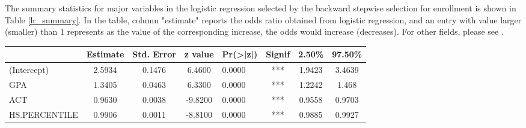 \documentclass[12pt,english]{report}
\begin{document}
The summary statistics for major variables in the logistic regression selected by the backward stepwise selection for enrollment is shown in Table \ref{lr_summary}. In the table, column "estimate" reports the odds ratio obtained from logistic regression, and an entry with value larger (smaller) than 1 represents as the value of the corresponding increase, the odds would  increase (decreases). For other fields, please see \citep{DesJardins2006, long2006regression}. 

\begin{table}[H]
\centering
\begin{adjustbox}{width=0.95\textwidth}
\begin{tabular}{|lccclccc|} \hline \hline
                               & Estimate & Std. Error & z value  &
                                                           Pr(\textgreater|z|) & Signif & 2.50\% & 97.50\% \\ \hline
(Intercept)                     & 2.5934   & 0.1476     & 6.4600   & 0.0000    & ***         & 1.9423 & 3.4639  \\
GPA                             & 1.3405   & 0.0463     & 6.3300   & 0.0000    & ***         & 1.2242 & 1.468   \\
ACT                             & 0.9630   & 0.0038     & -9.8200  & 0.0000    & ***         & 0.9558 & 0.9703  \\
HS.PERCENTILE                   & 0.9906   & 0.0011     & -8.8100  & 0.0000    & ***         & 0.9885 & 0.9927  \\

\end{tabular}
\end{adjustbox}
\end{table}
\end{document}
